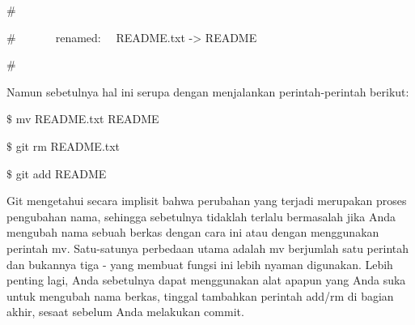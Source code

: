 \noindent 
{\fontsize{14pt}{14pt}\selectfont  $  \#  $ \\} \par
\noindent 
{\fontsize{14pt}{14pt}\selectfont  $  \#  $~~~~~~~renamed:~~  README.txt -> README \\} \par
\noindent 
{\fontsize{14pt}{14pt}\selectfont  $  \#  $ \\} \par
\noindent 
{\fontsize{14pt}{14pt}\selectfont Namun sebetulnya hal ini serupa dengan menjalankan perintah-perintah berikut: \\} \par
\noindent 
{\fontsize{14pt}{14pt}\selectfont  $  \$  $ mv README.txt README \\} \par
\noindent 
{\fontsize{14pt}{14pt}\selectfont  $  \$  $ git rm README.txt \\} \par
\noindent 
{\fontsize{14pt}{14pt}\selectfont  $  \$  $ git add README \\} \par
\noindent 
{\fontsize{14pt}{14pt}\selectfont Git mengetahui secara implisit bahwa perubahan yang terjadi merupakan proses pengubahan nama, sehingga sebetulnya tidaklah terlalu bermasalah jika Anda mengubah nama sebuah berkas dengan cara ini atau dengan menggunakan perintah $  $mv. Satu-satunya perbedaan utama adalah $  $mv $  $berjumlah satu perintah dan bukannya tiga - yang membuat fungsi ini lebih nyaman digunakan. Lebih penting lagi, Anda sebetulnya dapat menggunakan alat apapun yang Anda suka untuk mengubah nama berkas, tinggal tambahkan perintah add/rm di bagian akhir, sesaat sebelum Anda melakukan commit. \\} \par
\vspace{14pt}
\vspace{14pt}
\vspace{14pt}
\vspace{14pt}
\vspace{14pt}
